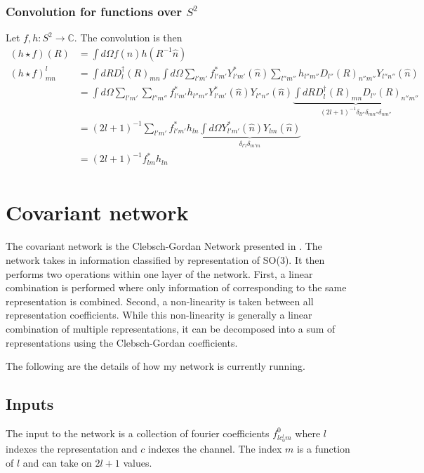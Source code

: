 \documentclass{article}
\begin{document}
\subsubsection{Convolution for functions  over $S^2$}
Let $f,h:S^2\rightarrow \mathbb{C}$. The convolution is then
\begin{align}
    (h\star f)(R) &= \int d\Omega f(\hat{n})h(R^{-1}\hat{n})\\
    (h\star f)^{l}_{mn} &= \int dR D^{\dagger}_{l}(R)_{mn}\int d\Omega \sum_{l'm'}f^{*}_{l'm'} Y^{*}_{l'm'}(\hat{n}) \sum_{l''m''}h_{l''m''}D_{l''}(R)_{n''m''}Y_{l''n''}(\hat{n})\\
    &= \int d\Omega \sum_{l'm'}\sum_{l''m''} f^{*}_{l'm'}h_{l''m''}Y^{*}_{l'm'}(\hat{n})Y_{l''n''}(\hat{n})\underbrace{\int dR D^{\dagger}_l(R)_{mn}D_{l''}(R)_{n''m''}}_{(2l+1)^{-1}\delta_{ll''}\delta_{mn''}\delta_{nm''}}\\
    &=  (2l+1)^{-1}\sum_{l'm'} f^{*}_{l'm'}h_{ln} \underbrace{\int d\Omega Y^{*}_{l'm'}(\hat{n})Y_{lm}(\hat{n})}_{\delta_{l'l}\delta_{m'm}}\\
    &= (2l+1)^{-1} f^{*}_{lm}h_{ln}\\ 
\end{align}

\section{Covariant network}
The covariant network is the Clebsch-Gordan Network presented in \cite{CG Net}. The network takes in information classified by representation of SO(3). It then performs two operations within one layer of the network. First, a linear combination is performed where only information of corresponding to the same representation is combined. Second, a non-linearity is taken between all representation coefficients. While this non-linearity is generally a linear combination of multiple representations, it can be decomposed into a sum of representations using the Clebsch-Gordan coefficients.

The following are the details of how my network is currently running.


\subsection{Inputs}
The input to the network is a collection of fourier coefficients $f^0_{lc^l_0m}$ where $l$ indexes the representation and $c$ indexes the channel. The index $m$ is a function of $l$ and can take on $2l+1$ values.
\end{document}
